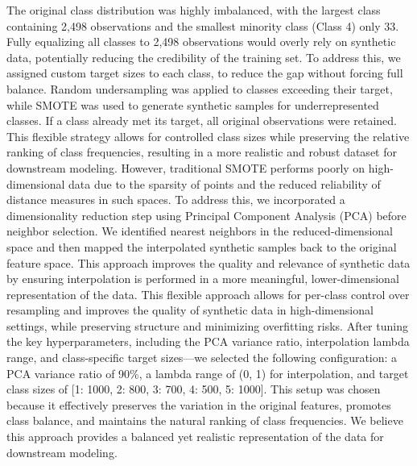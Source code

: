 The original class distribution was highly imbalanced, with the largest class containing 2,498 observations and the smallest minority 
class (Class 4) only 33. Fully equalizing all classes to 2,498 observations would overly rely on synthetic data, potentially 
reducing the credibility of the training set. To address this, we assigned custom target sizes to each class, to reduce the gap
without forcing full balance. Random undersampling was applied to classes exceeding their target, while SMOTE was used to generate
synthetic samples for underrepresented classes. If a class already met its target, all original observations were retained. 
This flexible strategy allows for controlled class sizes while preserving the relative ranking of class frequencies, 
resulting in a more realistic and robust dataset for downstream modeling. 
However, traditional SMOTE performs poorly on high-dimensional data due to the sparsity of points and the reduced reliability of
distance measures in such spaces. To address this, we incorporated a dimensionality reduction step using Principal Component Analysis (PCA)
before neighbor selection. We identified nearest neighbors in the reduced-dimensional space and then mapped the interpolated synthetic
samples back to the original feature space. This approach improves the quality and relevance of synthetic data by ensuring interpolation
is performed in a more meaningful, lower-dimensional representation of the data.
This flexible approach allows for per-class control over resampling and improves the quality of synthetic data in high-dimensional settings, 
while preserving structure and minimizing overfitting risks.
After tuning the key hyperparameters, including the PCA variance ratio, interpolation lambda range, and class-specific
target sizes—we selected the following configuration: a PCA variance ratio of 90\%, 
a lambda range of (0, 1) for interpolation, and target class sizes of [1: 1000, 2: 800, 3: 700, 4: 500, 5: 1000].
This setup was chosen because it effectively preserves the variation in the original features, promotes class balance,
and maintains the natural ranking of class frequencies. We believe this approach provides a balanced yet realistic
representation of the data for downstream modeling.


